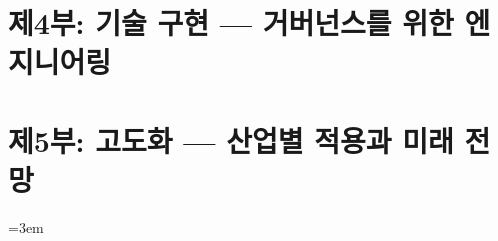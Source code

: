 \documentclass[a4paper,11pt,openany]{book}
\begin{document}
\part{제4부: 기술 구현 --- 거버넌스를 위한 엔지니어링}




\part{제5부: 고도화 --- 산업별 적용과 미래 전망}






\appendix







\begingroup
\emergencystretch=3em
\backmatter
\printbibliography
\endgroup
\end{document}

